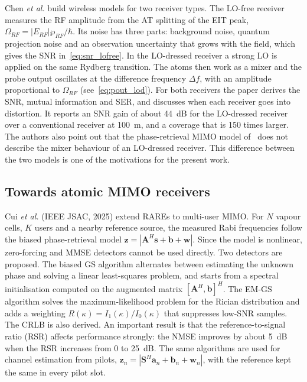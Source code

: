 \documentclass[11pt,a4paper]{article}
\begin{document}
Chen \textit{et al.} build wireless models for two receiver types. The LO-free receiver
measures the RF amplitude from the AT splitting of the EIT peak,
$\Omega_{RF}=|E_{RF}|\wp_{RF}/\hbar$. Its noise has three parts: background noise, quantum
projection noise and an observation uncertainty that grows with the field, which gives the
SNR in~\eqref{eq:snr_lofree}. In the LO-dressed receiver a strong LO is applied on the same
Rydberg transition. The atoms then work as a mixer and the probe output oscillates at the
difference frequency $\Delta f$, with an amplitude proportional to $\Omega_{RF}$
(see~\eqref{eq:pout_lod}). For both receivers the paper derives the SNR, mutual information
and SER, and discusses when each receiver goes into distortion. It reports an SNR gain of
about 44~dB for the LO-dressed receiver over a conventional receiver at 100~m, and a
coverage that is 150 times larger. The authors also point out that the phase-retrieval
MIMO model of~\cite{cui2025towards} does not describe the mixer behaviour of an LO-dressed
receiver. This difference between the two models is one of the motivations for the present work.

\subsection{\texorpdfstring{Towards atomic MIMO receivers~\cite{cui2025towards}}{Towards atomic MIMO receivers}}

Cui \textit{et al.} (IEEE JSAC, 2025) extend RAREs to multi-user MIMO. For $N$ vapour cells,
$K$ users and a nearby reference source, the measured Rabi frequencies follow the biased
phase-retrieval model $\mathbf z=|\mathbf A^H\mathbf s+\mathbf b+\mathbf w|$. Since the model is
nonlinear, zero-forcing and MMSE detectors cannot be used directly. Two detectors are proposed.
The biased GS algorithm alternates between estimating the unknown phase and solving a linear
least-squares problem, and starts from a spectral initialisation computed on the augmented
matrix $[\mathbf A^H,\mathbf b]^H$. The EM-GS algorithm solves the maximum-likelihood problem
for the Rician distribution and adds a weighting $R(\kappa)=I_1(\kappa)/I_0(\kappa)$ that
suppresses low-SNR samples. The CRLB is also derived. An important result is that the
reference-to-signal ratio (RSR) affects performance strongly: the NMSE improves by about
5~dB when the RSR increases from 0 to 25~dB. The same algorithms are used for channel
estimation from pilots, $\mathbf z_n=|\mathbf S^H\mathbf a_n+\mathbf b_n+\mathbf w_n|$, with the
reference kept the same in every pilot slot.
\end{document}
